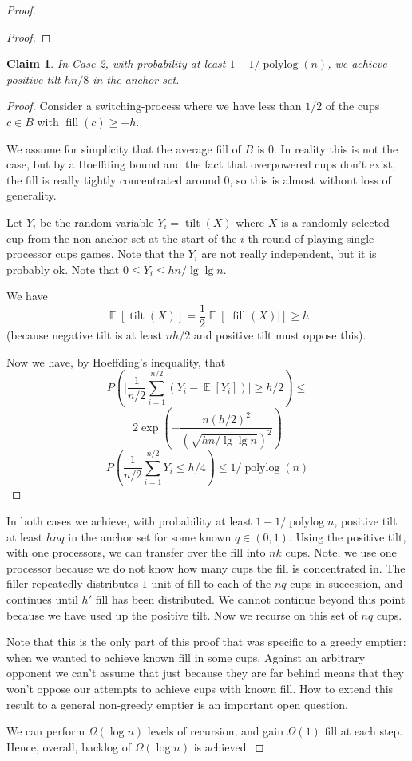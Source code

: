 \documentclass[twocolumn]{article}[10pt]
\DeclareMathOperator{\E}{\mathbb{E}}
\DeclareMathOperator{\polylog}{\text{polylog}}
\DeclareMathOperator{\tilt}{\text{tilt}}
\DeclareMathOperator{\fil}{\text{fill}}
\newtheorem{clm}{Claim}
\begin{document}
\begin{proof}
\begin{proof}
\end{proof}

\begin{clm}
  \label{clm:xtreme}
  In Case 2, with probability at least $1- 1/\polylog(n)$, we achieve positive tilt $hn/8$ in the anchor set.
\end{clm}

\begin{proof}
  Consider a switching-process where we have less than $1/2$ of the cups $c\in B$
  with $\fil(c) \ge -h$.


  We assume for simplicity that the average fill of $B$ is $0$. In reality this
  is not the case, but by a Hoeffding bound and the fact that overpowered cups don't
  exist, the fill is really tightly concentrated around $0$, so this is almost
  without loss of generality.

  Let $Y_i$ be the random variable $Y_i=\tilt(X)$ where $X$ is a randomly
  selected cup from the non-anchor set at the start of the $i$-th round of
  playing single processor cups games. {\color{red}Note that the $Y_i$ are not really
  independent, but it is probably ok}. Note that $0\le Y_i \le hn/\lg\lg n$.

  We have
  $$\E[\tilt(X)] = \frac{1}{2}\E[|\fil(X)|] \ge h$$
  (because negative tilt is at least $nh/2$ and positive tilt must oppose this).
  
  Now we have, by Hoeffding's inequality, that 
  $$P\left(\Big|\frac{1}{n/2} \sum_{i=1}^{n/2} (Y_i - \E[Y_i])\Big|\ge h/2
  \right) \le$$
  $$2\exp\left(-\frac{n(h/2)^2}{(\sqrt{hn/\lg\lg n})^2}\right) $$
  $$P\left(\frac{1}{n/2}\sum_{i=1}^{n/2} Y_i \le h/4\right) \le 1/\polylog(n) $$

\end{proof}

  In both cases we achieve, with probability at least $1-1/\polylog n$,
  positive tilt at least $hnq$ in the anchor set for some known $q\in(0,1)$. Using the
  positive tilt, with one processors, we can transfer over the fill into $nk$ cups. 
  Note, we use one processor because we do not know how many cups the fill is
  concentrated in. The filler repeatedly distributes $1$ unit of fill to each
  of the $nq$ cups in succession, and continues until $h'$ fill has been
  distributed. We cannot continue beyond this point because we have used up the
  positive tilt. Now we recurse on this set of $nq$ cups.

  Note that this is the only part of this proof that was specific to a greedy
  emptier: when we wanted to achieve known fill in some cups. Against an
  arbitrary opponent we can't assume that just because they are far behind
  means that they won't oppose our attempts to achieve cups with known fill.
  How to extend this result to a general non-greedy emptier is an important
  open question.

  We can perform $\Omega(\log n)$ levels of recursion, and gain $\Omega(1)$
  fill at each step. Hence, overall, backlog of $\Omega(\log n)$ is achieved.
\end{proof}
\end{document}
